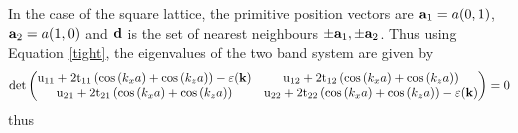 \documentclass[a4paper, 12pt]{article}
\begin{document}
\par	In the case of the square lattice, the primitive position vectors are ${\bf a}_1 = a(0,1)$, \quad ${\bf a}_2 = a(1,0)$ and ${\bf d}$ is the set of nearest neighbours $\pm {\bf a}_1, \pm {\bf a}_2$.
Thus using Equation \eqref{tight}, the eigenvalues of the two band system are given by
	\begin{equation}
		\rm det \begin{pmatrix} {\rm u}_{11}+2{\rm t_{11}}\left(\cos \left( k_xa \right)+ \cos \left( k_za \right)\right)-\varepsilon(\bf k) &{\rm u}_{12}+2{\rm t_{12}}
			\left(\cos \left( k_xa \right)+ \cos \left( k_za \right)\right) \\ {\rm u_{21}}+2
			{\rm t_{21}}\left(\cos \left( k_xa \right)+ \cos \left( k_za \right)\right) &{\rm u}_{22}+2{\rm t_{22}}\left(\cos \left( k_xa \right)+ \cos \left( k_za \right)\right)-\varepsilon(\bf k) \end{pmatrix} =0
	\end{equation}
	thus
\end{document}
